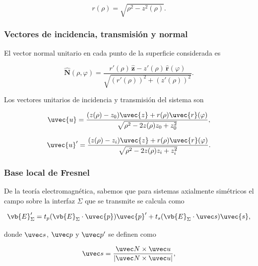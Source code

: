 \begin{equation}
  r(\rho)
  =
  \sqrt{\rho^2 - z^2(\rho)}.
  \label{eq:parametrical_ovoid_r_app}
\end{equation}

\subsubsection{Vectores de incidencia, transmisión y normal}

El vector normal unitario en cada punto de la superficie considerada es

\begin{equation}
  \mathbf{\hat N}(\rho,\varphi)
  =
  \frac{
  r'(\rho)\,\mathbf{\hat z}
  -
  z'(\rho)\,\mathbf{\hat r}(\varphi)
  }
  {
  \sqrt{(r'(\rho))^2+(z'(\rho))^2}
  }.
  \label{eq:N_ovoid_rho_phi_app}
\end{equation}

Los vectores unitarios de incidencia y transmisión del sistema son

\begin{equation}
  \uvec{u}
  =
  \frac{
  (z(\rho) - z_0)\uvec{z}
  +
  r(\rho)\uvec{r}(\varphi)
  }
  {
  \sqrt{\rho^2 - 2z(\rho)z_0 + z_0^2}
  },
  \label{eq:u_for_P_in_optical_axis_app}
\end{equation}

\begin{equation}
  \uvec{u}'
  =
  \frac{
  (z(\rho) - z_i)\uvec{z}
  +
  r(\rho)\uvec{r}(\varphi)
  }
  {
  \sqrt{\rho^2 - 2z(\rho)z_i + z_i^2}
  }.
  \label{eq:u_prime_for_P_in_optical_axis_app}
\end{equation}

\subsubsection{Base local de Fresnel}

De la teoría electromagnética, sabemos que para sistemas axialmente simétricos el campo sobre la interfaz $\Sigma$ que se transmite se calcula como

\begin{equation}
  \vb{E}'_{\Sigma}
  =
  t_p (\vb{E}_\Sigma \cdot \uvec{p}) \uvec{p}'
  +
  t_s (\vb{E}_\Sigma \cdot \uvec s) \uvec{s},
  \label{eq:Transmited_E_field_in_Sigma_app}
\end{equation}

donde $\uvec s$, $\uvec p$ y $\uvec p'$ se definen como

\begin{equation}
    \uvec s
    =
    \frac{\uvec N \times \uvec u}{\lvert  \uvec N \times \uvec u \rvert},
    \label{eq:s_hat_def_app}
\end{equation}

